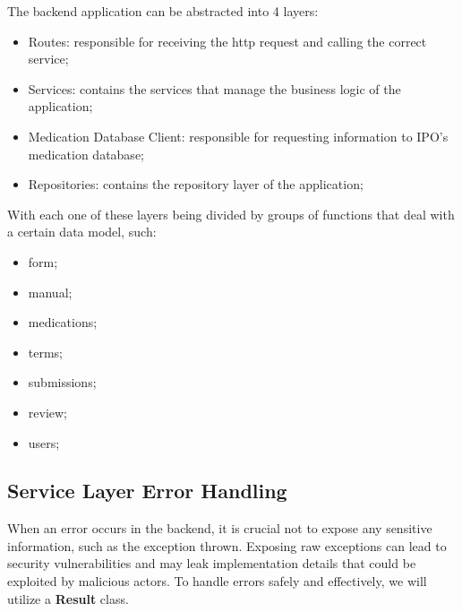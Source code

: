 The backend application can be abstracted into 4 layers:
\begin{itemize}
	\item Routes: responsible for receiving the http request and calling the correct service;
	\item Services: contains the services that manage the business logic of the application;
	\item Medication Database Client: responsible for requesting information to IPO's medication database;
	\item Repositories: contains the repository layer of the application;
\end{itemize}

With each one of these layers being divided by groups of functions that deal with a certain data model, such:
\begin{itemize}
	\item form;
	\item manual;
	\item medications;
	\item terms;
	\item submissions;
	\item review;
	\item users;
\end{itemize}

\subsection{Service Layer Error Handling}\label{service_layer_error_handling}

When an error occurs in the backend, it is crucial not to expose any sensitive information, such as the exception thrown. Exposing raw exceptions can lead to security vulnerabilities and may leak implementation details that could be exploited by malicious actors. To handle errors safely and effectively, we will utilize a \textbf{Result} class.

